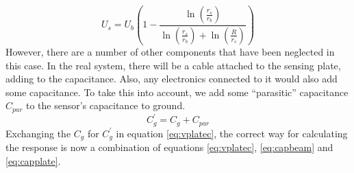 \begin{equation}
U_s = U_b \left(1-\frac{\ln\left(\frac{r_s}{r_b}\right)}{\ln\left(\frac{r_s}{r_b}\right)+\ln\left(\frac{R}{r_s}\right)} \right)
\end{equation}
However, there are a number of other components that have been neglected in this case. In the real system, there will be a cable attached to the sensing plate, adding to the capacitance. Also, any electronics connected to it would also add some capacitance. To take this into account, we add some ``parasitic'' capacitance $C_{par}$ to the sensor's capacitance to ground.
\begin{equation*}
C_g^\prime = C_g + C_{par} 
\end{equation*}
Exchanging the $C_g$ for $C_g^\prime$ in equation \ref{eq:vplatec}, the correct way for calculating the response is now a combination of equations \ref{eq:vplatec}, \ref{eq:capbeam} and \ref{eq:capplate}.

